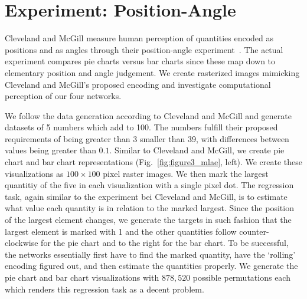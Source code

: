 \clearpage
\section{Experiment: Position-Angle}

Cleveland and McGill measure human perception of quantities encoded as positions and as angles through their position-angle experiment~\cite{cleveland_mcgill}. The actual experiment compares pie charts versus bar charts since these map down to elementary position and angle judgement. We create rasterized images mimicking Cleveland and McGill's proposed encoding and investigate computational perception of our four networks.

We follow the data generation according to Cleveland and McGill and generate datasets of 5 numbers which add to 100. The numbers fulfill their proposed requirements of being greater than 3 smaller than 39, with differences between values being greater than $0.1$. Similar to Cleveland and McGill, we create pie chart and bar chart representations (Fig.~\ref{fig:figure3_mlae}, left). We create these visualizations as $100\times100$ pixel raster images. We then mark the largest quantitiy of the five in each visualization with a single pixel dot. The regression task, again similar to the experiment bei Cleveland and McGill, is to estimate what value each quantity is in relation to the marked largest. Since the position of the largest element changes, we generate the targets in such fashion that the largest element is marked with 1 and the other quantities follow counter-clockwise for the pie chart and to the right for the bar chart. To be successful, the networks essentially first have to find the marked quantity, have the `rolling' encoding figured out, and then estimate the quantities properly. We generate the pie chart and bar chart visualizations with $878,520$ possible permutations each which renders this regression task as a decent problem.

